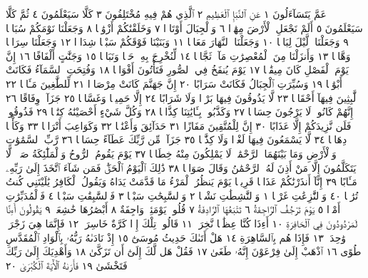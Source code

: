عَمَّ يَتَسَآءَلُونَ ١ عَنِ ٱلنَّبَإِ ٱلْعَظِيمِ ٢ ٱلَّذِي هُمْ فِيهِ مُخْتَلِفُونَ ٣
كَلَّا سَيَعْلَمُونَ ٤ ثُمَّ كَلَّا سَيَعْلَمُونَ ٥ أَلَمْ نَجْعَلِ ٱلْأَرْضَ مِهَٰدࣰا ٦
وَٱلْجِبَالَ أَوْتَادࣰا ٧ وَخَلَقْنَٰكُمْ أَزْوَٰجࣰا ٨ وَجَعَلْنَا نَوْمَكُمْ سُبَاتࣰا ٩
وَجَعَلْنَا ٱلَّيْلَ لِبَاسࣰا ١٠ وَجَعَلْنَا ٱلنَّهَارَ مَعَاشࣰا ١١ وَبَنَيْنَا
فَوْقَكُمْ سَبْعࣰا شِدَادࣰا ١٢ وَجَعَلْنَا سِرَاجࣰا وَهَّاجࣰا ١٣ وَأَنزَلْنَا مِنَ
ٱلْمُعْصِرَٰتِ مَآءࣰ ثَجَّاجࣰا ١٤ لِّنُخْرِجَ بِهِۦ حَبࣰّا وَنَبَاتࣰا ١٥ وَجَنَّٰتٍ
أَلْفَافًا ١٦ إِنَّ يَوْمَ ٱلْفَصْلِ كَانَ مِيقَٰتࣰا ١٧ يَوْمَ يُنفَخُ فِي ٱلصُّورِ
فَتَأْتُونَ أَفْوَاجࣰا ١٨ وَفُتِحَتِ ٱلسَّمَآءُ فَكَانَتْ أَبْوَٰبࣰا ١٩ وَسُيِّرَتِ
ٱلْجِبَالُ فَكَانَتْ سَرَابًا ٢٠ إِنَّ جَهَنَّمَ كَانَتْ مِرْصَادࣰا ٢١ لِّلطَّٰغِينَ
مَـَٔابࣰا ٢٢ لَّٰبِثِينَ فِيهَآ أَحْقَابࣰا ٢٣ لَّا يَذُوقُونَ فِيهَا بَرْدࣰا وَلَا
شَرَابًا ٢٤ إِلَّا حَمِيمࣰا وَغَسَّاقࣰا ٢٥ جَزَآءࣰ وِفَاقًا ٢٦ إِنَّهُمْ كَانُوا۟
لَا يَرْجُونَ حِسَابࣰا ٢٧ وَكَذَّبُوا۟ بِـَٔايَٰتِنَا كِذَّابࣰا ٢٨ وَكُلَّ شَيْءٍ
أَحْصَيْنَٰهُ كِتَٰبࣰا ٢٩ فَذُوقُوا۟ فَلَن نَّزِيدَكُمْ إِلَّا عَذَابًا ٣٠
إِنَّ لِلْمُتَّقِينَ مَفَازًا ٣١ حَدَآئِقَ وَأَعْنَٰبࣰا ٣٢ وَكَوَاعِبَ أَتْرَابࣰا ٣٣ وَكَأْسࣰا
دِهَاقࣰا ٣٤ لَّا يَسْمَعُونَ فِيهَا لَغْوࣰا وَلَا كِذَّٰبࣰا ٣٥ جَزَآءࣰ مِّن رَّبِّكَ عَطَآءً
حِسَابࣰا ٣٦ رَّبِّ ٱلسَّمَٰوَٰتِ وَٱلْأَرْضِ وَمَا بَيْنَهُمَا ٱلرَّحْمَٰنِۖ لَا يَمْلِكُونَ
مِنْهُ خِطَابࣰا ٣٧ يَوْمَ يَقُومُ ٱلرُّوحُ وَٱلْمَلَٰٓئِكَةُ صَفࣰّاۖ لَّا يَتَكَلَّمُونَ
إِلَّا مَنْ أَذِنَ لَهُ ٱلرَّحْمَٰنُ وَقَالَ صَوَابࣰا ٣٨ ذَٰلِكَ ٱلْيَوْمُ ٱلْحَقُّۖ فَمَن
شَآءَ ٱتَّخَذَ إِلَىٰ رَبِّهِۦ مَـَٔابًا ٣٩ إِنَّآ أَنذَرْنَٰكُمْ عَذَابࣰا قَرِيبࣰا يَوْمَ يَنظُرُ
ٱلْمَرْءُ مَا قَدَّمَتْ يَدَاهُ وَيَقُولُ ٱلْكَافِرُ يَٰلَيْتَنِي كُنتُ تُرَٰبَۢا ٤٠
وَٱلنَّٰزِعَٰتِ غَرْقࣰا ١ وَٱلنَّٰشِطَٰتِ نَشْطࣰا ٢ وَٱلسَّٰبِحَٰتِ سَبْحࣰا ٣
فَٱلسَّٰبِقَٰتِ سَبْقࣰا ٤ فَٱلْمُدَبِّرَٰتِ أَمْرࣰا ٥ يَوْمَ تَرْجُفُ ٱلرَّاجِفَةُ ٦
تَتْبَعُهَا ٱلرَّادِفَةُ ٧ قُلُوبࣱ يَوْمَئِذࣲ وَاجِفَةٌ ٨ أَبْصَٰرُهَا خَٰشِعَةࣱ ٩
يَقُولُونَ أَءِنَّا لَمَرْدُودُونَ فِي ٱلْحَافِرَةِ ١٠ أَءِذَا كُنَّا عِظَٰمࣰا نَّخِرَةࣰ ١١ قَالُوا۟
تِلْكَ إِذࣰا كَرَّةٌ خَاسِرَةࣱ ١٢ فَإِنَّمَا هِيَ زَجْرَةࣱ وَٰحِدَةࣱ ١٣ فَإِذَا هُم بِٱلسَّاهِرَةِ ١٤
هَلْ أَتَىٰكَ حَدِيثُ مُوسَىٰٓ ١٥ إِذْ نَادَىٰهُ رَبُّهُۥ بِٱلْوَادِ ٱلْمُقَدَّسِ طُوًى ١٦
ٱذْهَبْ إِلَىٰ فِرْعَوْنَ إِنَّهُۥ طَغَىٰ ١٧ فَقُلْ هَل لَّكَ إِلَىٰٓ أَن تَزَكَّىٰ ١٨
وَأَهْدِيَكَ إِلَىٰ رَبِّكَ فَتَخْشَىٰ ١٩ فَأَرَىٰهُ ٱلْأٓيَةَ ٱلْكُبْرَىٰ ٢٠
